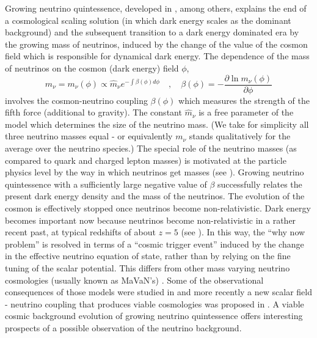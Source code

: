 Growing neutrino quintessence, developed in \cite{amendola_growing_2008,wetterich_growing_2007}, among others,
explains the end of a cosmological scaling solution (in which dark
energy scales as the dominant background) and the subsequent transition
to a dark energy dominated era by the growing mass of neutrinos, induced
by the change of the value of the cosmon field which is responsible
for dynamical dark energy. The dependence of the mass of neutrinos
on the cosmon (dark energy) field $\phi$, 
\begin{equation}
m_{\nu}=m_{\nu}(\phi)\propto\hat{m}_{\nu}e^{-\int\beta(\phi)d\phi}\quad,\quad \beta(\phi)=-\frac{\partial\ln m_{\nu}(\phi)}{\partial\phi}\label{eq: mass_def}
\end{equation}
involves the cosmon-neutrino coupling $\beta(\phi)$ which measures
the strength of the fifth force (additional to gravity). The constant
$\hat{m}_{\nu}$ is a free parameter of the model which determines
the size of the neutrino mass. (We take for simplicity all three neutrino
masses equal - or equivalently $m_{\nu}$ stands qualitatively for
the average over the neutrino species.) The special role of the neutrino
masses (as compared to quark and charged lepton masses) is motivated
at the particle physics level by the way in which neutrinos get masses
(see \cite{wetterich_growing_2007}). Growing neutrino quintessence with
a sufficiently large negative value of $\beta$ successfully relates
the present dark energy density and the mass of the neutrinos. The
evolution of the cosmon is effectively stopped once neutrinos become
non-relativistic. Dark energy becomes important now because neutrinos
become non-relativistic in a rather recent past, at typical redshifts
of about $z=5$ (see \cite{mota_neutrino_2008}). In this way, the ``why
now problem'' is resolved in terms of a ``cosmic trigger event''
induced by the change in the effective neutrino equation of state,
rather than by relying on the fine tuning of the scalar potential.
This differs from other mass varying neutrino cosmologies (usually
known as MaVaN's) \cite{brookfield_cosmology_2007,la_vacca_mass-varying_2013,bi_cosmological_2005,fardon_dark_2004,kaplan_neutrino_2004,spitzer_stability_2006,takahashi_speed_2006}.
Some of the observational consequences of those models were studied
in \cite{la_vacca_mass-varying_2013,kaplan_neutrino_2004} and more
recently a new scalar field - neutrino coupling that produces viable
cosmologies was proposed in \cite{simpson_dark_2016}. A viable cosmic
background evolution of growing neutrino quintessence offers interesting
prospects of a possible observation of the neutrino background.

